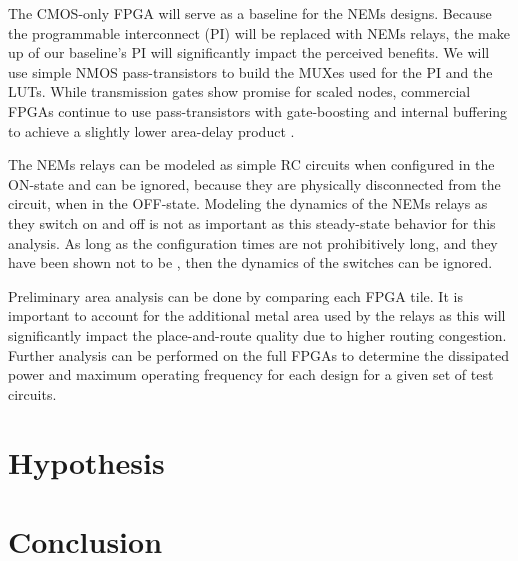 \documentclass[twoside,twocolumn]{article}
\begin{document}
The CMOS-only FPGA will serve as a baseline for the NEMs designs.
Because the programmable interconnect (PI) will be replaced with NEMs relays, the make up
of our baseline's PI will significantly impact the perceived benefits. 
We will use simple NMOS pass-transistors to build the MUXes used 
for the PI and the LUTs. While transmission gates show promise for scaled nodes, 
commercial FPGAs continue to use pass-transistors with gate-boosting and internal buffering
to achieve a slightly lower area-delay product \cite{chiasson_should_2013}.

The NEMs relays can be modeled as simple RC circuits when configured in the 
ON-state \cite{chen_efficient_2010} \cite{chen_integrated_2008} and can be ignored, 
because they are physically disconnected from the 
circuit, when in the OFF-state. Modeling the dynamics of the NEMs relays as they switch on and
off is not as important as this steady-state behavior for this analysis. 
As long as the configuration times are not prohibitively long, and they have been 
shown not to be \cite{??} \cite{??}, then the dynamics of the switches can be ignored.

Preliminary area analysis can be done by comparing each FPGA tile.
It is important to account for the additional metal area used by the 
relays as this will significantly impact the place-and-route quality
due to higher routing congestion. Further analysis can be performed 
on the full FPGAs to determine the dissipated power and maximum 
operating frequency for each design for a given set of test circuits.


\section{Hypothesis}


\section{Conclusion}





\end{document}
